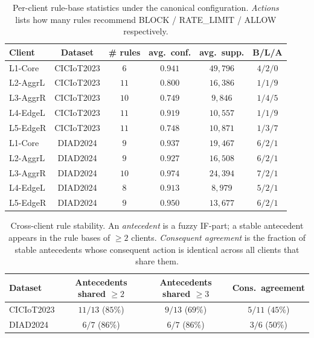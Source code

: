 \documentclass[ai,article,submit,moreauthors,pdftex]{Definitions/mdpi}
\newcommand{\rev}[1]{#1}
\begin{document}
\begin{table}[!htbp]
\centering
\rev{\caption{Per-client rule-base statistics under the canonical configuration. \emph{Actions} lists how many rules recommend BLOCK / RATE\_LIMIT / ALLOW respectively.}\label{tab:rule_stats}}
\rev{\small
\begin{tabular}{@{}lccccc@{}}
\toprule
\textbf{Client} & \textbf{Dataset} & \textbf{\# rules} & \textbf{avg.\ conf.} & \textbf{avg.\ supp.} & \textbf{B/L/A} \\
\midrule
L1-Core       & CICIoT2023 & $6$  & $0.941$ & $49{,}796$ & $4/2/0$ \\
L2-AggrL      & CICIoT2023 & $11$ & $0.800$ & $16{,}386$ & $1/1/9$ \\
L3-AggrR      & CICIoT2023 & $10$ & $0.749$ & $9{,}846$  & $1/4/5$ \\
L4-EdgeL      & CICIoT2023 & $11$ & $0.919$ & $10{,}557$ & $1/1/9$ \\
L5-EdgeR      & CICIoT2023 & $11$ & $0.748$ & $10{,}871$ & $1/3/7$ \\
\midrule
L1-Core       & DIAD2024   & $9$  & $0.937$ & $19{,}467$ & $6/2/1$ \\
L2-AggrL      & DIAD2024   & $9$  & $0.927$ & $16{,}508$ & $6/2/1$ \\
L3-AggrR      & DIAD2024   & $10$ & $0.974$ & $24{,}394$ & $7/2/1$ \\
L4-EdgeL      & DIAD2024   & $8$  & $0.913$ & $8{,}979$  & $5/2/1$ \\
L5-EdgeR      & DIAD2024   & $9$  & $0.950$ & $13{,}677$ & $6/2/1$ \\
\bottomrule
\end{tabular}}
\end{table}

\begin{table}[!htbp]
\centering
\rev{\caption{Cross-client rule stability. An \emph{antecedent} is a fuzzy IF-part; a stable antecedent appears in the rule bases of $\geq 2$ clients. \emph{Consequent agreement} is the fraction of stable antecedents whose consequent action is identical across all clients that share them.}\label{tab:rule_stability}}
\rev{\small
\begin{tabular}{@{}lccc@{}}
\toprule
\textbf{Dataset} & \textbf{Antecedents shared $\geq 2$} & \textbf{Antecedents shared $\geq 3$} & \textbf{Cons.\ agreement} \\
\midrule
CICIoT2023 & $11/13$ ($85\%$) & $9/13$  ($69\%$) & $5/11$ ($45\%$) \\
DIAD2024   & $6/7$   ($86\%$) & $6/7$   ($86\%$) & $3/6$  ($50\%$) \\
\bottomrule
\end{tabular}}
\end{table}
\end{document}
